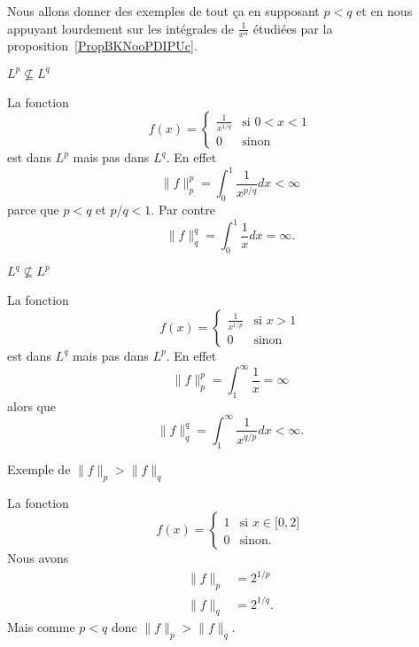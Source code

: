 Nous allons donner des exemples de tout ça en supposant \( p<q\) et en nous appuyant lourdement sur les intégrales de \( \frac{1}{ x^{\alpha} }\) étudiées par la proposition~\ref{PropBKNooPDIPUc}.

\begin{subproof}
	\item[\( L^p\nsubseteq L^q\)]

	La fonction
	\begin{equation}    \label{EqXIEooZpxObV}
		f(x)=\begin{cases}
			\frac{1}{ x^{1/q} } & \text{si } 0<x<1 \\
			0                   & \text{sinon}
		\end{cases}
	\end{equation}
	est dans \( L^p\) mais pas dans \( L^q\). En effet
	\begin{equation}
		\| f \|_p^p=\int_0^1\frac{1}{ x^{p/q} }dx<\infty
	\end{equation}
	parce que \( p<q\) et \( p/q<1\). Par contre
	\begin{equation}
		\| f \|_q^q=\int_0^1\frac{1}{ x }dx=\infty.
	\end{equation}

	\item[\( L^q\nsubseteq L^p\)]

	La fonction
	\begin{equation}
		f(x)=\begin{cases}
			\frac{1}{ x^{1/p} } & \text{si } x>1 \\
			0                   & \text{sinon}
		\end{cases}
	\end{equation}
	est dans \( L^q\) mais pas dans \( L^p\). En effet
	\begin{equation}
		\| f \|_p^p=\int_1^{\infty}\frac{1}{ x }=\infty
	\end{equation}
	alors que
	\begin{equation}
		\| f \|_q^q=\int_1^{\infty}\frac{1}{ x^{q/p} }dx<\infty.
	\end{equation}

	\item[Exemple de \( \| f \|_p>\| f \|_q\)]

	La fonction
	\begin{equation}
		f(x)=\begin{cases}
			1 & \text{si } x\in\mathopen[ 0 , 2 \mathclose] \\
			0 & \text{sinon.}
		\end{cases}
	\end{equation}
	Nous avons
	\begin{subequations}
		\begin{align}
			\| f \|_p & =2^{1/p}  \\
			\| f \|_q & =2^{1/q}.
		\end{align}
	\end{subequations}
	Mais comme \( p<q\) donc \( \| f \|_p>\| f \|_q\).



\end{subproof}
